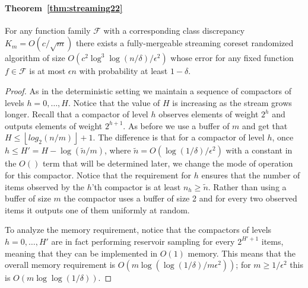 \documentclass[anon,12pt]{colt2019} %
\newcommand{\eps}{\epsilon}
\newcommand{\F}{\mathcal{F}}
\newcommand{\floor}[1]{\left \lfloor #1 \right \rfloor}
\begin{document}
{\paragraph{Theorem~\ref{thm:streaming22}}
For any function family $\F$ with a corresponding class discrepancy $K_m = O(c/\sqrt{m})$ there exists a fully-mergeable streaming coreset randomized algorithm of size $O\left(c^2\log^3\log(n/\delta) /\eps^2\right)$ whose error for any fixed function $f \in \F$ is at most $\eps n$ with probability at least $1-\delta$. 
\begin{proof}
As in the deterministic setting we maintain a sequence of compactors of levels $h=0,\ldots,H$. Notice that the value of $H$ is increasing as the stream grows longer. Recall that a compactor of level $h$ observes elements of weight $2^h$ and outputs elements of weight $2^{h+1}$. As before we use a buffer of $m$ and get that $H \leq  \floor{log_2(n/m)}+1$.
The difference is that for a compactor of level $h$, once $h \leq H' = H - \log(\tilde{n}/m)$, where $\tilde{n} = O(\log(1/\delta)/\eps^2)$ with a constant in the $O()$ term that will be determined later, we change the mode of operation for this compactor. Notice that the requirement for $h$ ensures that the number of items observed by the $h$'th compactor is at least $n_h \geq \tilde{n}$. Rather than using a buffer of size $m$ the compactor uses a buffer of size 2 and for every two observed items it outputs one of them uniformly at random.

To analyze the memory requirement, notice that the compactors of levels $h=0,\ldots,H'$ are in fact performing reservoir sampling for every $2^{H'+1}$ items, meaning that they can be implemented in $O(1)$ memory. This means that the overall memory requirement is $O(m\log(\log(1/\delta)/m\eps^2))$; for $m \geq 1/\eps^2$ this is $O(m\log\log(1/\delta))$. 


\end{proof}}
\end{document}
